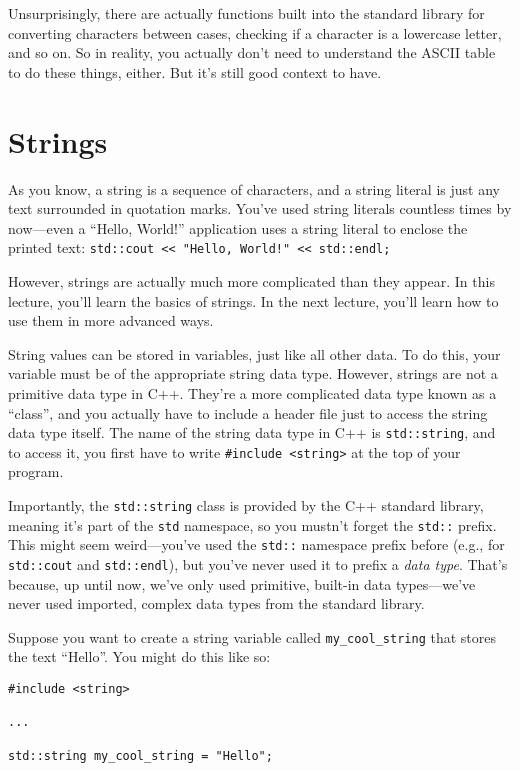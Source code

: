\documentclass{article}
\begin{document}
Unsurprisingly, there are actually functions built into the standard library for converting characters between cases, checking if a character is a lowercase letter, and so on. So in reality, you actually don't need to understand the ASCII table to do these things, either. But it's still good context to have.

\section{Strings}

As you know, a string is a sequence of characters, and a string literal is just any text surrounded in quotation marks. You've used string literals countless times by now---even a ``Hello, World!'' application uses a string literal to enclose the printed text: \texttt{std::cout << "Hello, World!" << std::endl;}

However, strings are actually much more complicated than they appear. In this lecture, you'll learn the basics of strings. In the next lecture, you'll learn how to use them in more advanced ways.

String values can be stored in variables, just like all other data. To do this, your variable must be of the appropriate string data type. However, strings are not a primitive data type in C++. They're a more complicated data type known as a ``class'', and you actually have to include a header file just to access the string data type itself. The name of the string data type in C++ is \texttt{std::string}, and to access it, you first have to write \texttt{\#include <string>} at the top of your program.

Importantly, the \texttt{std::string} class is provided by the C++ standard library, meaning it's part of the \texttt{std} namespace, so you mustn't forget the \texttt{std::} prefix. This might seem weird---you've used the \texttt{std::} namespace prefix before (e.g., for \texttt{std::cout} and \texttt{std::endl}), but you've never used it to prefix a \textit{data type}. That's because, up until now, we've only used primitive, built-in data types---we've never used imported, complex data types from the standard library.

Suppose you want to create a string variable called \texttt{my\_cool\_string} that stores the text ``Hello''. You might do this like so:

\clearpage

\begin{verbatim}
#include <string>

...

std::string my_cool_string = "Hello";
\end{verbatim}
\end{document}
